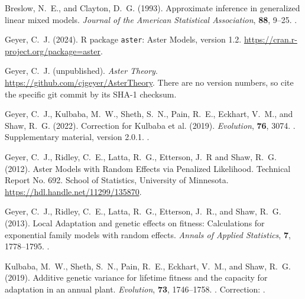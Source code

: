 \documentclass[11pt]{article}
\begin{document}
\begin{thebibliography}{}

Breslow, N.~E., and Clayton, D.~G. (1993).
\newblock Approximate inference in generalized linear mixed models.
\newblock \emph{Journal of the American Statistical Association},
    \textbf{88}, 9--25.
\newblock {}.

Geyer, C.~J. (2024).
\newblock R package \texttt{aster}: Aster Models, version 1.2.
\newblock \url{https://cran.r-project.org/package=aster}.

Geyer, C.~J. (unpublished).
\newblock \emph{Aster Theory}.
\newblock \url{https://github.com/cjgeyer/AsterTheory}.
\newblock There are no version numbers, so cite the specific git
    commit by its SHA-1 checksum.

Geyer, C.~J., Kulbaba, M.~W., Sheth, S.~N., Pain, R.~E., Eckhart, V.~M.,
    and Shaw, R.~G. (2022).
\newblock Correction for Kulbaba et al. (2019).
\newblock \emph{Evolution}, \textbf{76}, 3074.
\newblock {}.
\newblock Supplementary material, version 2.0.1.
\newblock {}.

Geyer, C.~J., Ridley, C.~E., Latta, R.~G., Etterson, J.~R and Shaw, R.~G.
    (2012).
\newblock Aster Models with Random Effects via Penalized Likelihood.
\newblock Technical Report No. 692.  School of Statistics,
    University of Minnesota.
\newblock \url{https://hdl.handle.net/11299/135870}.

Geyer, C.~J., Ridley, C.~E., Latta, R.~G., Etterson, J.~R., and Shaw, R.~G.
    (2013).
\newblock Local Adaptation and genetic effects on fitness: Calculations for
    exponential family models with random effects.
\newblock \emph{Annals of Applied Statistics}, \textbf{7}, 1778--1795.
\newblock {}.

Kulbaba, M.~W., Sheth, S.~N., Pain, R.~E., Eckhart, V.~M., and
    Shaw, R.~G. (2019).
\newblock Additive genetic variance for lifetime fitness and the capacity
    for adaptation in an annual plant.
\newblock \emph{Evolution}, \textbf{73}, 1746--1758.
\newblock {}.
\newblock Correction: \citet{zenodo}.


\end{thebibliography}
\end{document}
